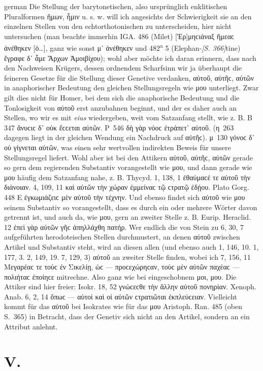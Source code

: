 \begin{otherlanguage*}{german}
Die Stellung der barytonetischen, also ursprünglich enklitischen Pluralformen ἥμων, ἧμιν u. s. w. will ich angesichts der Schwierigkeit sie an den einzelnen Stellen von den echtorthotonischen zu unterscheiden, hier nicht untersuchen (man beachte immerhin IGA. 486 (Milet) [Ἑρ]μηϲιάναξ ἥμεαϲ ἀνέθηκεν [ὁ…], ganz wie sonst μ᾽ ἀνέθηκεν und 482\textsuperscript{a} 5 (Elephan-\hypertarget{p366}{\emph{[S. 366]}}\label{p366}tine) ἔγραφε δ᾽ ἇμε Ἄρχων Ἁμοιβίχου); wohl aber möchte ich daran erinnern, dass nach den Nachweisen Krügers, dessen ordnendem Scharfsinn wir ja überhaupt die feineren Gesetze für die Stellung dieser Genetive verdanken, αὐτοῦ, αὐτῆϲ, αὐτῶν in anaphorischer Bedeutung den gleichen Stellungsregeln wie μου unterliegt. Zwar gilt dies nicht für Homer, bei dem sich die anaphorische Bedeutung und die Tonlosigkeit von αὐτοῦ erst anzubahnen beginnt, und der es daher auch an Stellen, wo wir es mit \emph{eius} wiedergeben, weit vom Satzanfang stellt, wie z. B. B 347 ἄνυϲιϲ δ᾽ οὐκ ἔϲϲεται αὐτῶν. Ρ~546 δὴ γὰρ νόοϲ ἐτράπετ᾽ αὐτοῦ. (η~263 dagegen liegt in der gleichen Wendung ein Nachdruck auf αὐτῆϲ). μ~130 γόνοϲ δ᾽ οὐ γίγνεται αὐτῶν, was einen sehr wertvollen indirekten Beweis für unsere Stellungsregel liefert. Wohl aber ist bei den Attikern αὐτοῦ, αὐτῆϲ, αὐτῶν gerade so gern dem regierenden Substantiv vorangestellt wie μου, und dann gerade wie μου häufig dem Satzanfang nahe, z. B. Thycyd. 1, 138, 1 ἐθαύμαϲέ τε αὐτοῦ τὴν διάνοιαν. 4, 109, 11 καὶ αὐτῶν τὴν χώραν ἐμμείναϲ τῷ ϲτρατῷ ἐδῄου. Plato Gorg. 448 Ε ἐγκωμιάζειϲ μὲν αὐτοῦ τὴν τέχνην. Und ebenso findet sich αὐτοῦ wie μου seinem Substantiv so vorangestellt, dass es durch ein oder mehrere Wörter davon getrennt ist, und auch da, wie μου, gern an zweiter Stelle z. B. Eurip. Heraclid. 12 ἐπεὶ γὰρ αὐτῶν γῆϲ ἀπηλλάχθη πατήρ. Wer endlich die von Stein zu 6, 30, 7 aufgeführten herodoteischen Stellen durchmustert, an denen αὐτοῦ zwischen Artikel und Substantiv steht, wird an diesen allen (und ebenso auch 1, 146, 10. 1, 177, 3. 2, 149, 19. 7, 129, 3) αὐτοῦ an zweiter Stelle finden, wobei ich 7, 156, 11 Μεγαρέαϲ τε τοὺϲ ἐν Σικελίῃ, ὡϲ — προϲεχώρηϲαν, τοὺϲ μὲν αὐτῶν παχέαϲ — πολιήταϲ ἐποίηϲε mitrechne. Also ganz wie bei eingeschobnem μοι, μου. Die Attiker sind hier freier: Isokr. 18, 52 γνώϲεϲθε τὴν ἄλλην αὐτοῦ πονηρίαν. Xenoph. Anab. 6, 2, 14 ὅπωϲ — αὐτοὶ καὶ οἱ αὐτῶν ϲτρατιῶται ἐκπλεύϲειαν. Vielleicht kommt für das αὐτοῦ bei Isokrates wie für das μου Aristoph. Ran. 485 (oben S.~365) in Betracht, dass der Genetiv sich nicht an den Artikel, sondern an ein Attribut anlehnt.

\section*{V.}


\end{otherlanguage*}
